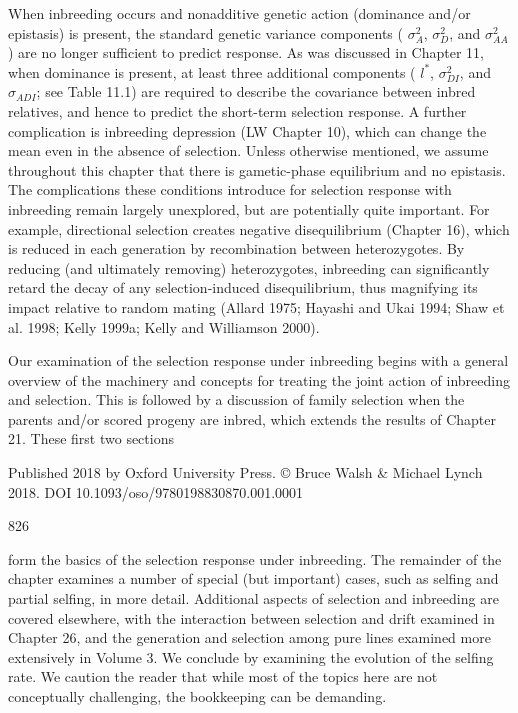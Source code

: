 \documentclass{article}
\begin{document}
When inbreeding occurs and nonadditive genetic action (dominance and/or epistasis) is present, the standard genetic variance components ( $ \sigma_{A}^{2} $,  $ \sigma_{D}^{2} $, and  $ \sigma_{A A}^{2} $) are no longer sufficient to predict response. As was discussed in Chapter 11, when dominance is present, at least three additional components ( $ l^{*} $,  $ \sigma_{D I}^{2} $, and  $ \sigma_{A D I} $; see Table 11.1) are required to describe the covariance between inbred relatives, and hence to predict the short-term selection response. A further complication is inbreeding depression (LW Chapter 10), which can change the mean even in the absence of selection. Unless otherwise mentioned, we assume throughout this chapter that there is gametic-phase equilibrium and no epistasis. The complications these conditions introduce for selection response with inbreeding remain largely unexplored, but are potentially quite important. For example, directional selection creates negative disequilibrium (Chapter 16), which is reduced in each generation by recombination between heterozygotes. By reducing (and ultimately removing) heterozygotes, inbreeding can significantly retard the decay of any selection-induced disequilibrium, thus magnifying its impact relative to random mating (Allard 1975; Hayashi and Ukai 1994; Shaw et al. 1998; Kelly 1999a; Kelly and Williamson 2000).

Our examination of the selection response under inbreeding begins with a general overview of the machinery and concepts for treating the joint action of inbreeding and selection. This is followed by a discussion of family selection when the parents and/or scored progeny are inbred, which extends the results of Chapter 21. These first two sections

Published 2018 by Oxford University Press. © Bruce Walsh & Michael Lynch 2018. DOI 10.1093/oso/9780198830870.001.0001

826

form the basics of the selection response under inbreeding. The remainder of the chapter examines a number of special (but important) cases, such as selfing and partial selfing, in more detail. Additional aspects of selection and inbreeding are covered elsewhere, with the interaction between selection and drift examined in Chapter 26, and the generation and selection among pure lines examined more extensively in Volume 3. We conclude by examining the evolution of the selfing rate. We caution the reader that while most of the topics here are not conceptually challenging, the bookkeeping can be demanding.
\end{document}
